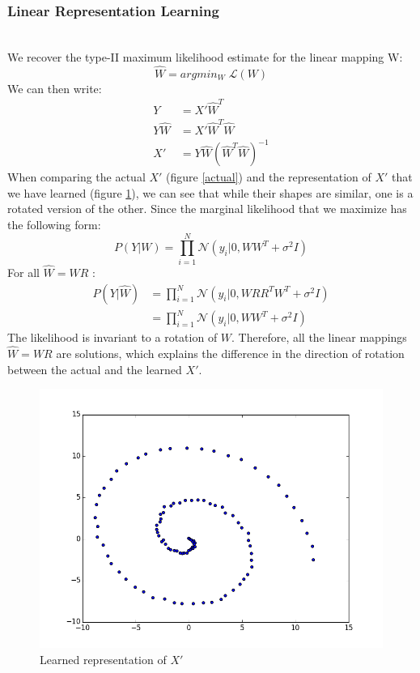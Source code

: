 \documentclass[a4paper,11pt]{article}
\theoremstyle{mytheor}
\begin{document}
\subsubsection{Linear Representation Learning}
\smallskip\\
We recover the type-II maximum likelihood estimate for the linear mapping W: 
\begin{equation*}
\hat{W} = argmin_W \; \mathcal{L}(W)
\end{equation*}
We can then write:
\begin{align*}
Y &= X'\hat{W}^T\\
Y\hat{W} &= X'\hat{W}^T\hat{W}\\
X' &= Y\hat{W}(\hat{W}^T\hat{W})^{-1}
\end{align*}
When comparing the actual $X'$ (figure \ref{actual}) and the representation of $X'$ that we have learned (figure \ref{recovered}), we can see that while their shapes are similar, one is a rotated version of the other. Since the marginal likelihood that we maximize has the following form:
\begin{equation*}
P(Y|W) = \prod\limits_{i=1}^{N}\mathcal{N}(y_i| 0 , WW^T + \sigma^2I)
\end{equation*}
For all $\hat{W}= WR$ :
\begin{equation*}
\begin{split}
P(Y|\hat{W}) &= \prod\limits_{i=1}^{N}\mathcal{N}(y_i| 0 , WRR^TW^T + \sigma^2I)\\
&=\prod\limits_{i=1}^{N}\mathcal{N}(y_i| 0 , WW^T + \sigma^2I)
\end{split}
\end{equation*}
The likelihood is invariant to a rotation of $W$. Therefore, all the linear mappings $\hat{W}= WR$ are solutions, which explains the difference in the direction of rotation between the actual and the learned $X'$.

\begin{figure}[h]
\centering
\includegraphics[scale =0.75]{awesome} 
\caption{Learned representation of $X'$}
\label{recovered}
\end{figure}
\end{document}
